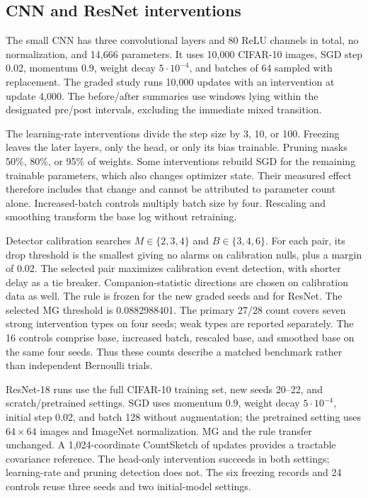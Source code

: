 {\subsection{CNN and ResNet interventions}
The small CNN has three convolutional layers and 80 ReLU channels in total, no normalization, and 14,666 parameters. It uses 10,000 CIFAR-10 images, SGD step 0.02, momentum 0.9, weight decay $5\cdot10^{-4}$, and batches of 64 sampled with replacement. The graded study runs 10,000 updates with an intervention at update 4,000. The before/after summaries use windows lying within the designated pre/post intervals, excluding the immediate mixed transition.

The learning-rate interventions divide the step size by 3, 10, or 100. Freezing leaves the later layers, only the head, or only its bias trainable. Pruning masks 50\%, 80\%, or 95\% of weights. Some interventions rebuild SGD for the remaining trainable parameters, which also changes optimizer state. Their measured effect therefore includes that change and cannot be attributed to parameter count alone. Increased-batch controls multiply batch size by four. Rescaling and smoothing transform the base log without retraining.

\begin{table}[t]
\centering\small
\caption{}

\end{table}

Detector calibration searches $M\in\{2,3,4\}$ and $B\in\{3,4,6\}$. For each pair, its drop threshold is the smallest giving no alarms on calibration nulls, plus a margin of 0.02. The selected pair maximizes calibration event detection, with shorter delay as a tie breaker. Companion-statistic directions are chosen on calibration data as well. The rule is frozen for the new graded seeds and for ResNet. The selected MG threshold is 0.0882988401. The primary 27/28 count covers seven strong intervention types on four seeds; weak types are reported separately. The 16 controls comprise base, increased batch, rescaled base, and smoothed base on the same four seeds. Thus these counts describe a matched benchmark rather than independent Bernoulli trials.

ResNet-18 runs use the full CIFAR-10 training set, new seeds 20--22, and scratch/pretrained settings. SGD uses momentum 0.9, weight decay $5\cdot10^{-4}$, initial step 0.02, and batch 128 without augmentation; the pretrained setting uses $64\times64$ images and ImageNet normalization. MG and the rule transfer unchanged. A 1,024-coordinate CountSketch of updates provides a tractable covariance reference. The head-only intervention succeeds in both settings; learning-rate and pruning detection does not. The six freezing records and 24 controls reuse three seeds and two initial-model settings.

}
